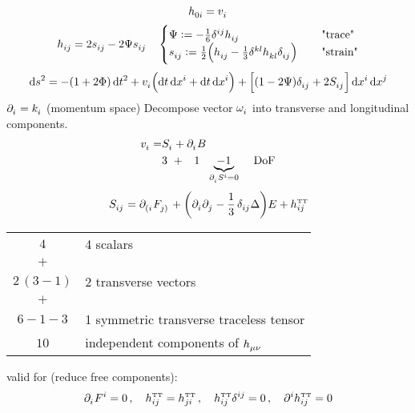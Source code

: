 \begin{equation}
	\tensor{h}{_{0i}} = \tensor{v}{_i}
\end{equation}
\begin{equation}
	\tensor{h}{_{ij}} = 2\tensor{s}{_{ij}} - 2\Psi\tensor{s}{_{ij}}\,\quad
	\begin{cases}
		\Psi := -\frac{1}{6}\tensor{\delta}{^{ij}}\tensor{h}{_{ij}}\,\quad &\text{"trace"} \\
		\tensor{s}{_{ij}} := \frac{1}{2} \left(\tensor{h}{_{ij}} - \frac{1}{3}\tensor{\delta}{^{kl}}\tensor{h}{_{kl}}\tensor{\delta}{_{ij}}\right)\,\quad &\text{"strain"}
	\end{cases}
\end{equation}
\begin{equation}
	\dif s^2 = -\left(1+2\Phi\right)\dif t^2 + \tensor{v}{_i} \left(\dif t \dif \tensor{x}{^i} + \dif t \dif \tensor{x}{^i}\right) + \left[\left(1-2\Psi\right)\tensor{\delta}{_{ij}} + 2 \tensor{S}{_{ij}} \right]\dif \tensor{x}{^i}\dif \tensor{x}{^j}
\end{equation}
$\tensor{\partial}{_i} = \tensor{k}{_i}$ (momentum space)
Decompose vector $\tensor{\omega}{_i}$ into transverse and longitudinal components.
\begin{align}
	\tensor{v}{_i} = &\tensor{S}{_i} + \tensor{\partial}{_i}B\\
	&3\,\,+\,\,\,\,\,1\,\,\,\,\underbrace{-1}_{\tensor{\partial}{_i}\tensor{S}{^i}=0}\,\quad \text{DoF}
\end{align}
\begin{equation}
	\tensor{S}{_{ij}} = \tensor{\partial}{_{(i}}\tensor{F}{_{j)}} + \left( \tensor{\partial}{_i}\tensor{\partial}{_j} - \frac{1}{3}\,\tensor{\delta}{_{ij}}\Delta\right) E + \tensor*{h}{_{ij}^{\text{\tiny TT}}}
\end{equation}
\begin{center}
\begin{tabular}{c l}
$4$ & 4 scalars \\
$+$ & \\
$2\,(3-1)$ & 2 transverse vectors \\
$+$ & \\
$6-1-3$ & 1 symmetric transverse traceless tensor \\
\midrule
$10$ & independent components of $\tensor{h}{_{\mu\nu}}$
\end{tabular}
\end{center}
valid for (reduce free components):
\begin{equation}
\tensor{\partial}{_i}\tensor{F}{^i}=0\,,\quad\tensor*{h}{_{ij}^{\text{\tiny TT}}}=\tensor*{h}{_{ji}^{\text{\tiny TT}}}\,,\quad\tensor*{h}{_{ij}^{\text{\tiny TT}}}\tensor{\delta}{^{ij}}=0\,,\quad\tensor{\partial}{^i}\tensor*{h}{_{ij}^{\text{\tiny TT}}}=0
\end{equation}
